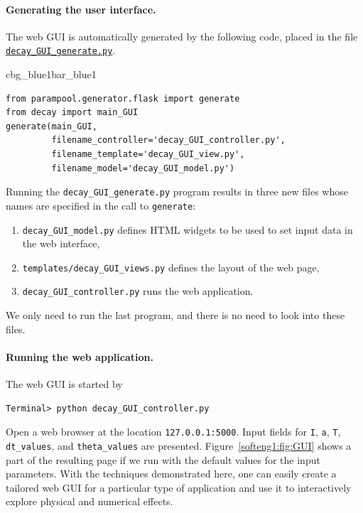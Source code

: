 \documentclass[%
oneside,                 %
final,                   %
10pt]{article}
\newenvironment{_pro_tight}[2]{
   \def\FrameCommand{\color{#2}\vrule width 1mm\normalcolor\colorbox{#1}}
   \FrameRule0.6pt\MakeFramed {\advance\hsize-2mm\FrameRestore}\vskip3mm}
   {\vskip0mm\endMakeFramed}
\newenvironment{pro}[2]{
\bgroup\rmfamily
\fboxsep=0mm\relax
\begin{_pro_tight}{#1}{#2}
\list{}{\parsep=-2mm\parskip=0mm\topsep=0pt\leftmargin=2mm
\rightmargin=2\leftmargin\leftmargin=4pt\relax}
\item\relax}
{\endlist\end{_pro_tight}\egroup}
\begin{document}
\paragraph{Generating the user interface.}
The web GUI is automatically generated by
the following code, placed in the file \href{{http://tinyurl.com/ofkw6kc/softeng/decay_GUI_generate.py}}{\nolinkurl{decay_GUI_generate.py}}.

\begin{pro}{cbg_blue1}{bar_blue1}\begin{Verbatim}[numbers=none,fontsize=\fontsize{9pt}{9pt},baselinestretch=0.95,xleftmargin=2mm]
from parampool.generator.flask import generate
from decay import main_GUI
generate(main_GUI,
         filename_controller='decay_GUI_controller.py',
         filename_template='decay_GUI_view.py',
         filename_model='decay_GUI_model.py')
\end{Verbatim}
\end{pro}
\noindent
Running the \Verb!decay_GUI_generate.py! program results in three new
files whose names are specified in the call to \texttt{generate}:

\begin{enumerate}
 \item \Verb!decay_GUI_model.py! defines HTML widgets to be used to set
    input data in the web interface,

 \item \Verb!templates/decay_GUI_views.py! defines the layout of the web page,

 \item \Verb!decay_GUI_controller.py! runs the web application.
\end{enumerate}

\noindent
We only need to run the last program, and there is no need to look into
these files.

\paragraph{Running the web application.}
The web GUI is started by

\begin{Verbatim}[frame=lines,label=\fbox{{\tiny Terminal}},framesep=2.5mm,framerule=0.7pt,fontsize=\fontsize{9pt}{9pt}]
Terminal> python decay_GUI_controller.py
\end{Verbatim}
Open a web browser at the location \texttt{127.0.0.1:5000}. Input fields for
\texttt{I}, \texttt{a}, \texttt{T}, \Verb!dt_values!, and \Verb!theta_values! are presented.  Figure~\ref{softeng1:fig:GUI} shows a part of the resulting page if we run
with the default values for the input parameters.
With the techniques demonstrated here, one can
easily create a tailored web GUI for a particular type of application
and use it to interactively explore physical and numerical effects.
\end{document}
